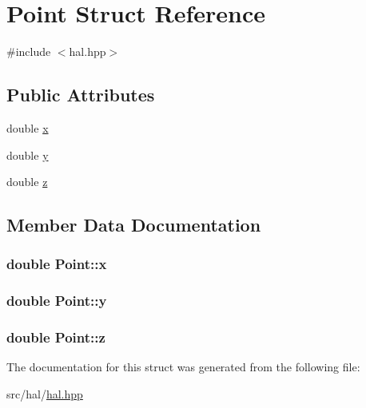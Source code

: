 \hypertarget{struct_point}{}\section{Point Struct Reference}
\label{struct_point}


{\ttfamily \#include $<$hal.\+hpp$>$}

\subsection*{Public Attributes}
\begin{DoxyCompactItemize}
\item 
double \hyperlink{struct_point_ab99c56589bc8ad5fa5071387110a5bc7}{x}
\item 
double \hyperlink{struct_point_afa38be143ae800e6ad69ce8ed4df62d8}{y}
\item 
double \hyperlink{struct_point_a05ba3b1dfcb19430582ae953cbbfbded}{z}
\end{DoxyCompactItemize}


\subsection{Member Data Documentation}
\subsubsection[{\texorpdfstring{x}{x}}]{\setlength{\rightskip}{0pt plus 5cm}double Point\+::x}\hypertarget{struct_point_ab99c56589bc8ad5fa5071387110a5bc7}{}\label{struct_point_ab99c56589bc8ad5fa5071387110a5bc7}
\subsubsection[{\texorpdfstring{y}{y}}]{\setlength{\rightskip}{0pt plus 5cm}double Point\+::y}\hypertarget{struct_point_afa38be143ae800e6ad69ce8ed4df62d8}{}\label{struct_point_afa38be143ae800e6ad69ce8ed4df62d8}
\subsubsection[{\texorpdfstring{z}{z}}]{\setlength{\rightskip}{0pt plus 5cm}double Point\+::z}\hypertarget{struct_point_a05ba3b1dfcb19430582ae953cbbfbded}{}\label{struct_point_a05ba3b1dfcb19430582ae953cbbfbded}


The documentation for this struct was generated from the following file\+:\begin{DoxyCompactItemize}
\item 
src/hal/\hyperlink{hal_8hpp}{hal.\+hpp}\end{DoxyCompactItemize}
